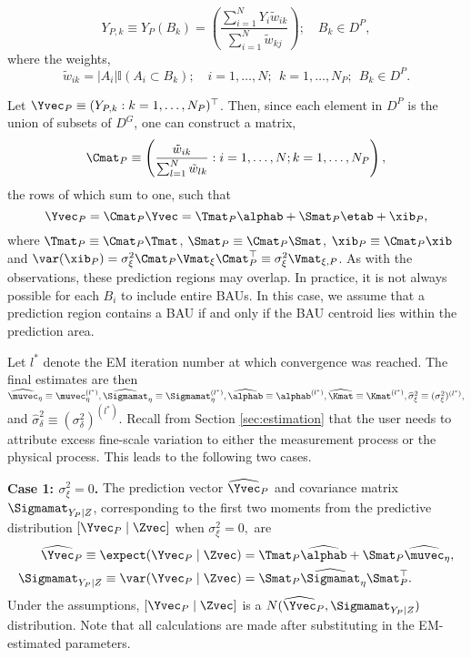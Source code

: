 \begin{equation*}
Y_{P,k} \equiv Y_{P}(B_k) = \left(\frac{\sum_{i =1}^N Y_i \tilde w_{ik}}{\sum_{i=1}^N \tilde w_{kj}}\right); \quad B_k \in D^P,
\end{equation*}
where the weights,
$$ \tilde w_{ik} = |A_i|\mathbb{I}(A_i \subset B_k); \quad i = 1,\dots,N;~~k = 1,\dots, N_P; ~~B_k \in D^P.$$

Let $\Yvec_P \equiv (Y_{P,k} : k = 1,\dots,N_P)^\top$. Then, since each element in $D^P$ is the union of subsets of $D^G$, one can construct a matrix,
\begin{equation}\label{eq:CP}
\Cmat_P \equiv \left(\frac{\tilde w_{ik}}{\sum_{l=1}^N \tilde w_{lk}} : i = 1,\dots,N; k = 1,\dots,N_P\right),
\end{equation}
the rows of which sum to one, such that
\begin{equation*}
\Yvec_P = \Cmat_P\Yvec = \Tmat_P\alphab + \Smat_P\etab + \xib_P,
\end{equation*}
where $\Tmat_P \equiv \Cmat_P \Tmat$, $\Smat_P \equiv \Cmat_P \Smat$, $\xib_P \equiv \Cmat_P \xib$ and $\var(\xib_P) = \sigma^2_\xi\Cmat_P\Vmat_\xi\Cmat_P^\top \equiv \sigma^2_\xi\Vmat_{\xi,P}$.  As with the observations, these prediction regions may overlap. In practice, it is not always possible for each $B_i$ to include entire BAUs. In this case, we assume that a prediction region contains a BAU if and only if the BAU centroid lies within the prediction area.

Let $l^*$ denote the EM iteration number at which convergence was reached. The final estimates are then $\widehat\muvec_\eta \equiv \muvec_\eta^{(l^*)}, \widehat\Sigmamat_\eta \equiv \Sigmamat_\eta^{(l^*)}, \widehat\alphab \equiv \alphab^{(l^*)}, \widehat\Kmat \equiv \Kmat^{(l^*)}, \widehat\sigma^2_\xi \equiv (\sigma^2_\xi)^{(l^*)},$ and $\widehat\sigma^2_\delta \equiv (\sigma^2_\delta)^{(l^*)}$. Recall from Section \ref{sec:estimation} that the user needs to attribute excess fine-scale variation to either the measurement process or the physical process. This leads to the following two cases.

{\bf Case 1: $\sigma^2_\xi = 0$.} The prediction vector $\widehat\Yvec_P$ and covariance matrix $\Sigmamat_{Y_P\mid Z}$, corresponding to the first two moments from the predictive distribution $[\Yvec_P \mid \Zvec]$ when $\sigma^2_\xi = 0,$ are
\begin{align*}
\widehat\Yvec_P \equiv \expect(\Yvec_P \mid \Zvec) &= \Tmat_P\widehat\alphab + \Smat_P\widehat\muvec_\eta, \\%
\Sigmamat_{Y_P \mid Z} \equiv \var(\Yvec_P\mid \Zvec) &= \Smat_P \widehat\Sigmamat_\eta\Smat_P^\top. %
\end{align*}
 Under the assumptions, $[\Yvec_P \mid \Zvec]$ is a $N(\widehat\Yvec_P,\Sigmamat_{Y_P \mid Z})$ distribution. Note that all calculations are made after substituting in the EM-estimated parameters.

